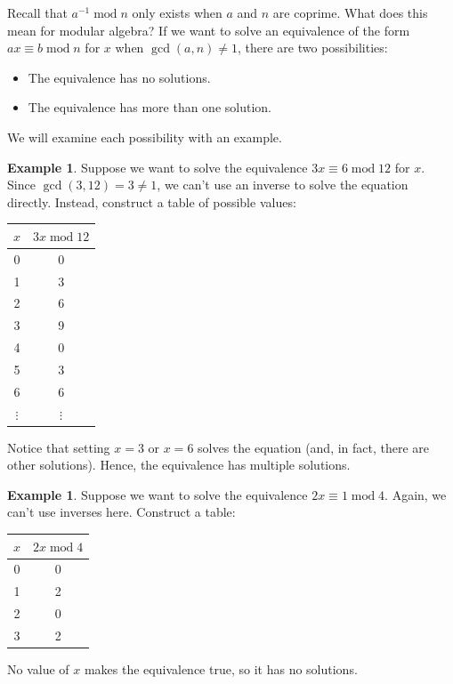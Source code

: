 \documentclass{book}
\theoremstyle{plain}
\theoremstyle{definition}
\newtheorem{example}[theorem]{Example}
\renewcommand{\mod}{\operatorname{mod}}
\renewcommand{\mod}{\operatorname{mod}}
\begin{document}
Recall that $a^{-1} \mod n$ only exists when $a$ and $n$ are coprime. What does this mean for modular algebra? If we want to solve an equivalence of the form $ax \equiv b \mod n$ for $x$ when $\gcd(a,n) \neq 1$, there are two possibilities:
\begin{itemize}
\item The equivalence has no solutions.
\item The equivalence has more than one solution.
\end{itemize}

We will examine each possibility with an example.

\begin{example}
Suppose we want to solve the equivalence $3x \equiv 6 \mod 12$ for $x$. Since $\gcd(3,12) = 3 \neq 1$, we can't use an inverse to solve the equation directly. Instead, construct a table of possible values:
\begin{center}
\begin{tabular}{c|c}
$x$ & $3x \mod 12$ \\
\hline
0 & 0 \\
1 & 3 \\
2 & 6 \\
3 & 9 \\
4 & 0 \\
5 & 3 \\
6 & 6 \\
$\vdots$ & $\vdots$
\end{tabular}
\end{center}
Notice that setting $x = 3$ or $x = 6$ solves the equation (and, in fact, there are other solutions). Hence, the equivalence has multiple solutions.
\end{example}

\begin{example}
Suppose we want to solve the equivalence $2x \equiv 1 \mod 4$. Again, we can't use inverses here. Construct a table:
\begin{center}
\begin{tabular}{c|c}
$x$ & $2x \mod 4$ \\
\hline
0 & 0 \\
1 & 2 \\
2 & 0 \\
3 & 2
\end{tabular}
\end{center}
No value of $x$ makes the equivalence true, so it has no solutions.
\end{example}
\end{document}
